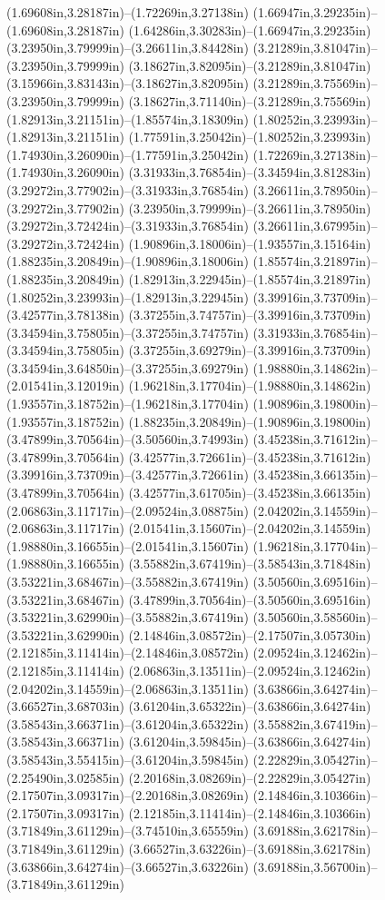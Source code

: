 (1.69608in,3.28187in)--(1.72269in,3.27138in) (1.66947in,3.29235in)--(1.69608in,3.28187in) (1.64286in,3.30283in)--(1.66947in,3.29235in) (3.23950in,3.79999in)--(3.26611in,3.84428in) (3.21289in,3.81047in)--(3.23950in,3.79999in) (3.18627in,3.82095in)--(3.21289in,3.81047in) (3.15966in,3.83143in)--(3.18627in,3.82095in) (3.21289in,3.75569in)--(3.23950in,3.79999in) (3.18627in,3.71140in)--(3.21289in,3.75569in) (1.82913in,3.21151in)--(1.85574in,3.18309in) (1.80252in,3.23993in)--(1.82913in,3.21151in) (1.77591in,3.25042in)--(1.80252in,3.23993in) (1.74930in,3.26090in)--(1.77591in,3.25042in) (1.72269in,3.27138in)--(1.74930in,3.26090in) (3.31933in,3.76854in)--(3.34594in,3.81283in) (3.29272in,3.77902in)--(3.31933in,3.76854in) (3.26611in,3.78950in)--(3.29272in,3.77902in) (3.23950in,3.79999in)--(3.26611in,3.78950in) (3.29272in,3.72424in)--(3.31933in,3.76854in) (3.26611in,3.67995in)--(3.29272in,3.72424in) (1.90896in,3.18006in)--(1.93557in,3.15164in) (1.88235in,3.20849in)--(1.90896in,3.18006in) (1.85574in,3.21897in)--(1.88235in,3.20849in) (1.82913in,3.22945in)--(1.85574in,3.21897in) (1.80252in,3.23993in)--(1.82913in,3.22945in) (3.39916in,3.73709in)--(3.42577in,3.78138in) (3.37255in,3.74757in)--(3.39916in,3.73709in) (3.34594in,3.75805in)--(3.37255in,3.74757in) (3.31933in,3.76854in)--(3.34594in,3.75805in) (3.37255in,3.69279in)--(3.39916in,3.73709in) (3.34594in,3.64850in)--(3.37255in,3.69279in) (1.98880in,3.14862in)--(2.01541in,3.12019in) (1.96218in,3.17704in)--(1.98880in,3.14862in) (1.93557in,3.18752in)--(1.96218in,3.17704in) (1.90896in,3.19800in)--(1.93557in,3.18752in) (1.88235in,3.20849in)--(1.90896in,3.19800in) (3.47899in,3.70564in)--(3.50560in,3.74993in) (3.45238in,3.71612in)--(3.47899in,3.70564in) (3.42577in,3.72661in)--(3.45238in,3.71612in) (3.39916in,3.73709in)--(3.42577in,3.72661in) (3.45238in,3.66135in)--(3.47899in,3.70564in) (3.42577in,3.61705in)--(3.45238in,3.66135in) (2.06863in,3.11717in)--(2.09524in,3.08875in) (2.04202in,3.14559in)--(2.06863in,3.11717in) (2.01541in,3.15607in)--(2.04202in,3.14559in) (1.98880in,3.16655in)--(2.01541in,3.15607in) (1.96218in,3.17704in)--(1.98880in,3.16655in) (3.55882in,3.67419in)--(3.58543in,3.71848in) (3.53221in,3.68467in)--(3.55882in,3.67419in) (3.50560in,3.69516in)--(3.53221in,3.68467in) (3.47899in,3.70564in)--(3.50560in,3.69516in) (3.53221in,3.62990in)--(3.55882in,3.67419in) (3.50560in,3.58560in)--(3.53221in,3.62990in) (2.14846in,3.08572in)--(2.17507in,3.05730in) (2.12185in,3.11414in)--(2.14846in,3.08572in) (2.09524in,3.12462in)--(2.12185in,3.11414in) (2.06863in,3.13511in)--(2.09524in,3.12462in) (2.04202in,3.14559in)--(2.06863in,3.13511in) (3.63866in,3.64274in)--(3.66527in,3.68703in) (3.61204in,3.65322in)--(3.63866in,3.64274in) (3.58543in,3.66371in)--(3.61204in,3.65322in) (3.55882in,3.67419in)--(3.58543in,3.66371in) (3.61204in,3.59845in)--(3.63866in,3.64274in) (3.58543in,3.55415in)--(3.61204in,3.59845in) (2.22829in,3.05427in)--(2.25490in,3.02585in) (2.20168in,3.08269in)--(2.22829in,3.05427in) (2.17507in,3.09317in)--(2.20168in,3.08269in) (2.14846in,3.10366in)--(2.17507in,3.09317in) (2.12185in,3.11414in)--(2.14846in,3.10366in) (3.71849in,3.61129in)--(3.74510in,3.65559in) (3.69188in,3.62178in)--(3.71849in,3.61129in) (3.66527in,3.63226in)--(3.69188in,3.62178in) (3.63866in,3.64274in)--(3.66527in,3.63226in) (3.69188in,3.56700in)--(3.71849in,3.61129in) 